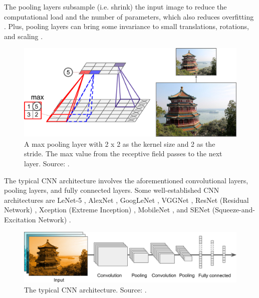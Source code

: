 \documentclass[a4paper, 11pt, oneside]{article}
\begin{document}
The pooling layers subsample (i.e. shrink) the input image to reduce the computational load and the number of parameters,
which also reduces overfitting \cite{geron2019hands}. Plus, pooling layers can bring some invariance to small
translations, rotations, and scaling \cite{geron2019hands}.

\begin{figure}[ht]
  \begin{center}
    \includegraphics[width=.5\textwidth]{max_pooling.png}
  \end{center}
  \caption{A max pooling layer with 2 x 2 as the kernel size and 2 as the stride. The max value from the receptive
  field passes to the next layer. Source: \cite{geron2019hands}.}
\end{figure}

The typical CNN architecture involves the aforementioned convolutional layers, pooling layers, and fully connected layers.
Some well-established CNN architectures are LeNet-5 \cite{lecun1998gradient}, AlexNet \cite{krizhevsky2012imagenet},
GoogLeNet \cite{szegedy2015going}, VGGNet \cite{simonyan2014very}, ResNet (Residual Network) \cite{he2016deep}, Xception
(Extreme Inception) \cite{chollet2017xception}, MobileNet \cite{howard2017mobilenets, sandler2018mobilenetv2},
and SENet (Squeeze-and-Excitation Network) \cite{hu2018squeeze}.

\begin{figure}[ht]
  \begin{center}
    \includegraphics[width=.8\textwidth]{typical_cnn.png}
  \end{center}
  \caption{The typical CNN architecture. Source: \cite{geron2019hands}.}
\end{figure}
\end{document}
